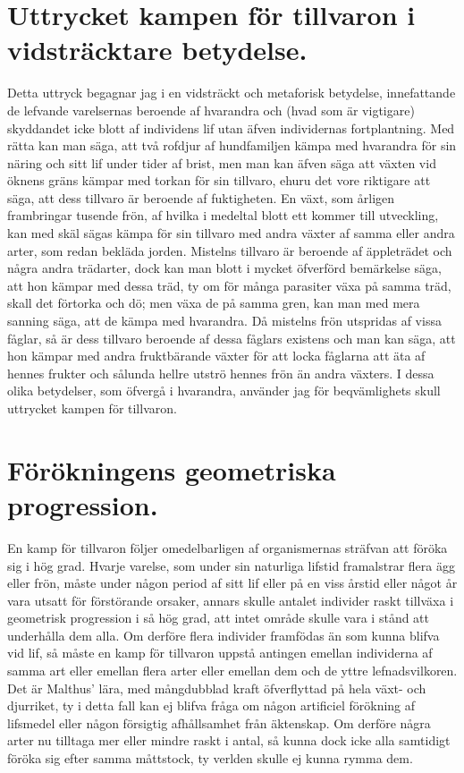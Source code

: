 \section[Uttrycket för kampen]{Uttrycket kampen för tillvaron i vidsträcktare betydelse.}

Detta uttryck begagnar jag i en vidsträckt och metaforisk betydelse, innefattande de lefvande varelsernas beroende af hvarandra och (hvad som är vigtigare) skyddandet icke blott af individens lif utan äfven individernas fortplantning. Med rätta kan man säga, att två rofdjur af hundfamiljen kämpa med hvarandra för sin näring och sitt lif under tider af brist, men man kan äfven säga att växten vid öknens gräns kämpar med torkan för sin tillvaro, ehuru det vore riktigare att säga, att dess tillvaro är beroende af fuktigheten. En växt, som årligen frambringar tusende frön, af hvilka i medeltal blott ett kommer till utveckling, kan med skäl sägas kämpa för sin tillvaro med andra växter af samma eller andra arter, som redan bekläda jorden. Mistelns tillvaro är beroende af äppleträdet och några andra trädarter, dock kan man blott i mycket öfverförd bemärkelse säga, att hon kämpar med dessa träd, ty om för många parasiter växa på samma träd, skall det förtorka och dö; men växa de på samma gren, kan man med mera sanning säga, att de kämpa med hvarandra. Då mistelns frön utspridas af vissa fåglar, så är dess tillvaro beroende af dessa fåglars existens och man kan säga, att hon kämpar med andra fruktbärande växter för att locka fåglarna att äta af hennes frukter och sålunda hellre utströ hennes frön än andra växters. I dessa olika betydelser, som öfvergå i hvarandra, använder jag för beqvämlighets skull uttrycket kampen för tillvaron.



\section{Förökningens geometriska progression.}

En kamp för tillvaron följer omedelbarligen af organismernas sträfvan att föröka sig i hög grad. Hvarje varelse, som under sin naturliga lifstid framalstrar flera ägg eller frön, måste under någon period af sitt lif eller på en viss årstid eller något år vara utsatt för förstörande orsaker, annars skulle antalet individer raskt tillväxa i geometrisk progression i så hög grad, att intet område skulle vara i stånd att underhålla dem alla. Om derföre flera individer framfödas än som kunna blifva vid lif, så måste en kamp för tillvaron uppstå antingen emellan individerna af samma art eller emellan flera arter eller emellan dem och de yttre lefnadsvilkoren. Det är Malthus’ lära, med mångdubblad kraft öfverflyttad på hela växt- och djurriket, ty i detta fall kan ej blifva fråga om någon artificiel förökning af lifsmedel eller någon försigtig afhållsamhet från äktenskap. Om derföre några arter nu tilltaga mer eller mindre raskt i antal, så kunna dock icke alla samtidigt föröka sig efter samma måttstock, ty verlden skulle ej kunna rymma dem.

